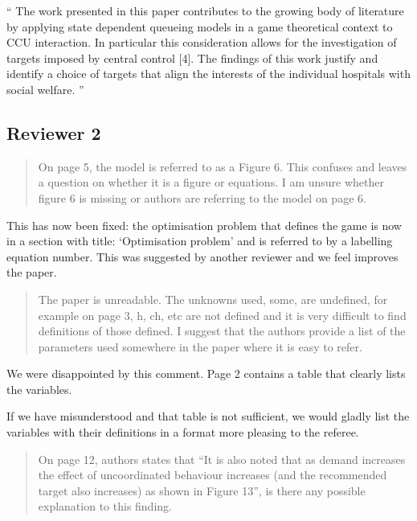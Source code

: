 \documentclass{article}
\begin{document}
``
The work presented in this paper contributes to the growing body of literature by applying state dependent queueing models in a game theoretical context to CCU interaction.
In particular this consideration allows for the investigation of targets imposed by central control [4].
The findings of this work justify and identify a choice of targets that align the interests of the individual hospitals with social welfare.
''

\subsection{Reviewer 2}

\begin{quote}
    \begin{textit}{
    On page 5, the model is referred to as a Figure 6. This confuses and leaves a question on whether it is a figure or equations. I am unsure whether figure 6 is missing or authors are referring to the model on page 6.
    }\end{textit}
\end{quote}

This has now been fixed: the optimisation problem that defines the game is now
in a section with title: `Optimisation problem' and is referred to by a
labelling equation number. This was suggested by another reviewer and we feel
improves the paper.

\begin{quote}
    \begin{textit}{
The paper is unreadable. The unknowns used, some, are undefined, for example on page 3, h, ch, etc are not defined and it is very difficult to find definitions of those defined. I suggest that the authors provide a list of the parameters used somewhere in the paper where it is easy to refer.
    }\end{textit}
\end{quote}

We were disappointed by this comment. Page 2 contains a table that clearly
lists the variables.

If we have misunderstood and that table is not sufficient, we would gladly list
the variables with their definitions in a format more pleasing to the referee.

\begin{quote}
    \begin{textit}{
    On page 12, authors states that ``It is also noted that as demand increases the effect of uncoordinated behaviour increases (and the recommended target also increases) as shown in Figure 13'', is there any possible explanation to this finding.
    }\end{textit}
\end{quote}
\end{document}
